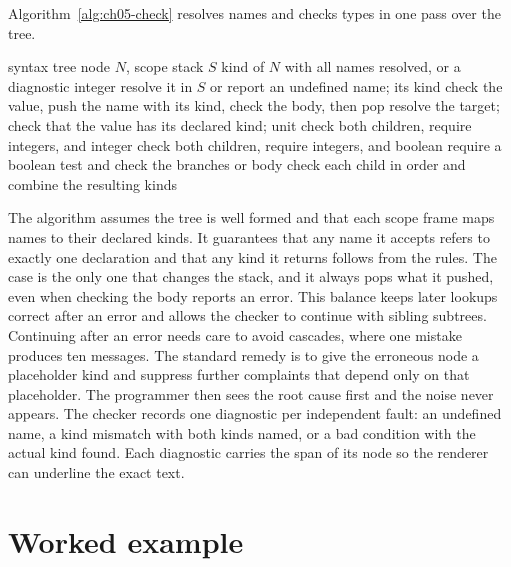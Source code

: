 Algorithm~\ref{alg:ch05-check} resolves names and checks types in one pass over the tree.
\begin{algorithm}
\caption{Single-pass name resolution and type checking for Mini.}
\label{alg:ch05-check}
\begin{pseudocode}
\Require syntax tree node $N$, scope stack $S$
\Ensure kind of $N$ with all names resolved, or a diagnostic
 \State \Return integer
 \State resolve it in $S$ or report an undefined name; \Return its kind
 \State check the value, push the name with its kind, check the body, then pop
 \State resolve the target; check that the value has its declared kind; \Return unit
 \State check both children, require integers, and \Return integer
 \State check both children, require integers, and \Return boolean
 \State require a boolean test and check the branches or body
\Else \State check each child in order and combine the resulting kinds
\EndIf
\EndFunction
\end{pseudocode}
\end{algorithm}
The algorithm assumes the tree is well formed and that each scope frame maps names to their declared kinds.
It guarantees that any name it accepts refers to exactly one declaration and that any kind it returns follows from the rules.
The  case is the only one that changes the stack, and it always pops what it pushed, even when checking the body reports an error.
This balance keeps later lookups correct after an error and allows the checker to continue with sibling subtrees.
Continuing after an error needs care to avoid cascades, where one mistake produces ten messages.
The standard remedy is to give the erroneous node a placeholder kind and suppress further complaints that depend only on that placeholder.
The programmer then sees the root cause first and the noise never appears.
The checker records one diagnostic per independent fault: an undefined name, a kind mismatch with both kinds named, or a bad condition with the actual kind found.
Each diagnostic carries the span of its node so the renderer can underline the exact text.

\section{Worked example}
\label{sec:ch05-worked-example}

